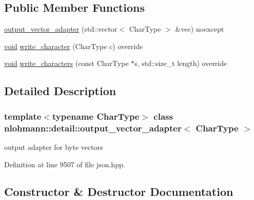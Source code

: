\subsection*{Public Member Functions}
\begin{DoxyCompactItemize}
\item 
\mbox{\hyperlink{classnlohmann_1_1detail_1_1output__vector__adapter_a9c4fbf88fda356837038ec30a264cd3e}{output\+\_\+vector\+\_\+adapter}} (std\+::vector$<$ Char\+Type $>$ \&vec) noexcept
\item 
\mbox{\hyperlink{namespacenlohmann_1_1detail_a59fca69799f6b9e366710cb9043aa77d}{void}} \mbox{\hyperlink{classnlohmann_1_1detail_1_1output__vector__adapter_af6a22d4210bb7bc2da66021300ddd6db}{write\+\_\+character}} (Char\+Type c) override
\item 
\mbox{\hyperlink{namespacenlohmann_1_1detail_a59fca69799f6b9e366710cb9043aa77d}{void}} \mbox{\hyperlink{classnlohmann_1_1detail_1_1output__vector__adapter_ad6f6c461dec7bedd5359454dc22fc9aa}{write\+\_\+characters}} (const Char\+Type $\ast$s, std\+::size\+\_\+t length) override
\end{DoxyCompactItemize}


\subsection{Detailed Description}
\subsubsection*{template$<$typename Char\+Type$>$\newline
class nlohmann\+::detail\+::output\+\_\+vector\+\_\+adapter$<$ Char\+Type $>$}

output adapter for byte vectors 

Definition at line 9507 of file json.\+hpp.



\subsection{Constructor \& Destructor Documentation}
\mbox{\label{classnlohmann_1_1detail_1_1output__vector__adapter_a9c4fbf88fda356837038ec30a264cd3e}} 

